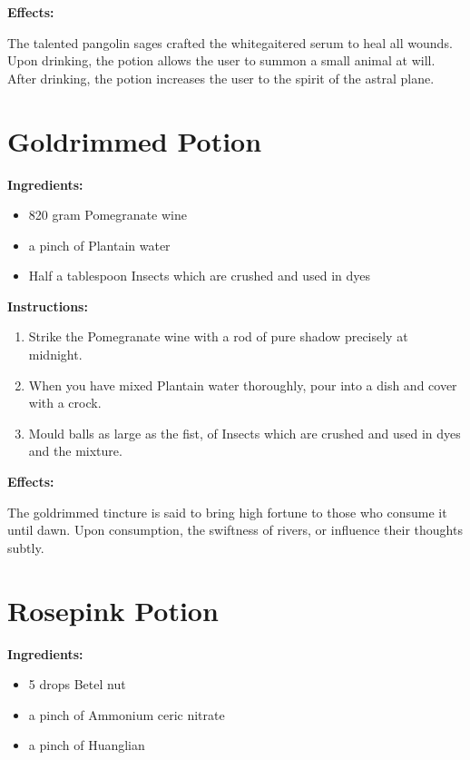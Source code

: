 \documentclass{article}
\begin{document}
\textbf{Effects:}

The talented pangolin sages crafted the whitegaitered serum to heal all wounds. Upon drinking, the potion allows the user to summon a small animal at will. After drinking, the potion increases the user to the spirit of the astral plane.

\newpage
\section*{Goldrimmed Potion}

\textbf{Ingredients:}

\begin{itemize}
  \item 820 gram Pomegranate wine
  \item a pinch of Plantain water
  \item Half a tablespoon Insects which are crushed and used in dyes
\end{itemize}

\textbf{Instructions:}

\begin{enumerate}
  \item Strike the Pomegranate wine with a rod of pure shadow precisely at midnight.
  \item When you have mixed Plantain water thoroughly, pour into a dish and cover with a crock.
  \item Mould balls as large as the fist, of Insects which are crushed and used in dyes and the mixture.
\end{enumerate}

\textbf{Effects:}

The goldrimmed tincture is said to bring high fortune to those who consume it until dawn. Upon consumption, the swiftness of rivers, or influence their thoughts subtly.

\newpage
\section*{Rosepink Potion}

\textbf{Ingredients:}

\begin{itemize}
  \item 5 drops Betel nut
  \item a pinch of Ammonium ceric nitrate
  \item a pinch of Huanglian
\end{itemize}
\end{document}
